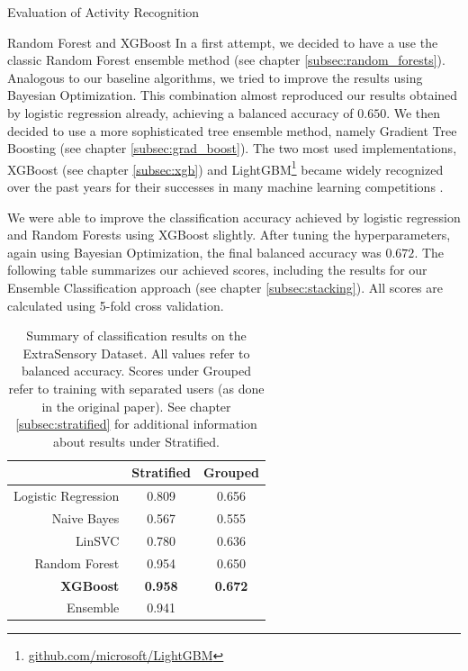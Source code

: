 \begin{section}{Evaluation of Activity Recognition}
	\begin{subsection}{Random Forest and XGBoost}
		In a first attempt, we decided to have a use the classic Random Forest ensemble method (see chapter \ref{subsec:random_forests}). Analogous to our baseline algorithms, we tried to improve the results using Bayesian Optimization. This combination almost reproduced our results obtained by logistic regression already, achieving a balanced accuracy of $0.650$. We then decided to use a more sophisticated tree ensemble method, namely Gradient Tree Boosting (see chapter \ref{subsec:grad_boost}). The two most used implementations, XGBoost (see chapter \ref{subsec:xgb}) and LightGBM\footnote{\href{https://github.com/microsoft/LightGBM}{github.com/microsoft/LightGBM}} became widely recognized over the past years for their successes in many machine learning competitions \cite{Chen16}. \par
		We were able to improve the classification accuracy achieved by logistic regression and Random Forests using XGBoost slightly. After tuning the hyperparameters, again using Bayesian Optimization, the final balanced accuracy was $0.672$.  The following table summarizes our achieved scores, including the results for our Ensemble Classification approach (see chapter \ref{subsec:stacking}). All scores are calculated using 5-fold cross validation.
		\begin{table}[H]
			\begin{center} 
				\begin{tabular}{r|c|c}
					\toprule
					& Stratified & Grouped \\
					\midrule
					Logistic Regression & 0.809 & 0.656 \\
					Naive Bayes & 0.567 & 0.555 \\
					LinSVC & 0.780 & 0.636 \\
					Random Forest & 0.954 & 0.650 \\
					\textbf{XGBoost} & \textbf{0.958} & \textbf{0.672} \\
					\midrule
					Ensemble & 0.941 & \\
					\bottomrule
				\end{tabular}
			\end{center}
			\caption{Summary of classification results on the ExtraSensory Dataset. All values refer to balanced accuracy. Scores under \glqq Grouped\grqq{} refer to training with separated users (as done in the original paper). See chapter \ref{subsec:stratified} for additional information about results under \glqq Stratified\grqq.}
			\label{table:results}
		\end{table}
	\end{subsection}


\end{section}

